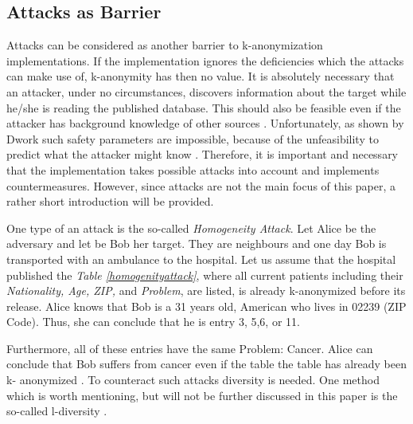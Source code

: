 \documentclass{llncs}
\begin{document}
\subsection{Attacks as Barrier}

Attacks can be considered as another barrier to k-anonymization implementations. If the implementation ignores the deficiencies which the attacks can make use of, k-anonymity has then no value. It is absolutely necessary that an attacker, under no circumstances, discovers information about the target while he/she is reading the published database. This should also be feasible even if the attacker has background knowledge of other sources   \cite{Dalenius1977}. Unfortunately, as shown by Dwork such safety parameters are impossible, because of the unfeasibility to predict what the attacker might know \cite{dwork2011differential}. Therefore, it is important and necessary that the implementation takes possible attacks into account and implements countermeasures. However, since attacks are not the main focus of this paper, a rather short introduction will be provided. 

One type of an attack is the so-called \textit{Homogeneity Attack}. Let Alice be the adversary and let be Bob her target. They are neighbours and one day Bob is transported with an ambulance to the hospital. Let us assume that the hospital published the \textit{Table \ref{homogenityattack}}, where all current patients including their \textit{Nationality, Age, ZIP,} and \textit{Problem}, are listed, is already k-anonymized before its release. Alice knows that Bob is a 31 years old, American who lives in 02239 (ZIP Code). Thus, she can conclude that he is entry 3, 5,6, or 11.

Furthermore, all of these entries have the same Problem: Cancer. Alice can conclude that Bob suffers from cancer even if the table the table has already been k- anonymized  \cite{sweeney2002k,ldiversity}. To counteract such attacks diversity is needed. One method which is worth mentioning, but will not be further discussed in this paper is the so-called l-diversity \cite{ldiversity}.  
\end{document}
